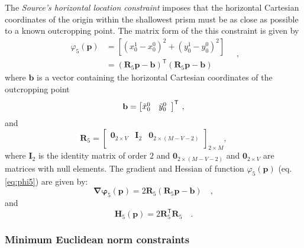 The \textit{Source's horizontal location constraint} imposes that the horizontal Cartesian coordinates of the origin within 
the shallowest prism must be as close as possible to a known outcropping point. The matrix form of the this constraint is given by
\begin{equation}\label{eq:phi5}
\begin{split}
\varphi_{5}(\mathbf{p}) &= \left[\left(x_{0}^{1} - x_{0}^{0}\right)^2 + \left(y_{0}^{1} - y_0^0\right)^2\right] \\
&= \left(\mathbf{R}_{5} \mathbf{p} - \mathbf{b} \right)^{\mathsf{T}}
\left(\mathbf{R}_{5} \mathbf{p} - \mathbf{b}\right)
\end{split} \quad ,
\end{equation}
where $\mathbf{b}$ is a vector containing the horizontal Cartesian coordinates of the outcropping point 
\begin{equation}
\mathbf{b} = \left[ \begin{array}{@{}*{12}{c}@{}}
\tilde{x}_{0}^{0} & \tilde{y}_{0}^{0} \\
\end{array} \right]^{\mathsf{T}} \: ,
\label{eq:b-vector}
\end{equation}
and
\begin{equation}
\mathbf{R}_{5} = 
\begin{bmatrix}
\mathbf{0}_{2 \times V} & \mathbf{I}_{2} & \mathbf{0}_{2 \times (M-V-2)} \\
\end{bmatrix}_{2 \times M},
\label{eq:R5-matrix}
\end{equation}
where $\mathbf{I}_{2}$ is the identity matrix of order $2$ and $\mathbf{0}_{2 \times (M-V-2)}$ and 
$\mathbf{0}_{2 \times V}$ are matrices with null elements. The gradient and Hessian of function $\varphi_{5}(\mathbf{p})$ (eq. \ref{eq:phi5}) are given by:
\begin{equation}\label{eq:phi5_grad}
\boldsymbol{\nabla\varphi}_{5}(\mathbf{p}) = 2\mathbf{R}_{5}
\left(\mathbf{R}_{5} \mathbf{p} - \mathbf{b}\right) \quad ,
\end{equation}
and
\begin{equation}\label{eq:phi5_hessian}
\mathbf{H}_{5}(\mathbf{p}) = 2 \mathbf{R}^{\mathsf{T}}_{5}\mathbf{R}_{5} \quad .
\end{equation}

\subsubsection{Minimum Euclidean norm constraints}

